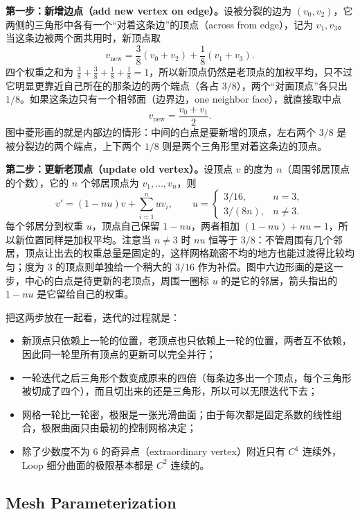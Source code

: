 \textbf{第一步：新增边点（add new vertex on edge）。}设被分裂的边为 $(v_0, v_2)$，它两侧的三角形中各有一个“对着这条边”的顶点（across from edge），记为 $v_1, v_3$。当这条边被两个面共用时，新顶点取
\[
v_{\text{new}} = \frac{3}{8}(v_0 + v_2) + \frac{1}{8}(v_1 + v_3).
\]
四个权重之和为 $\frac{3}{8} + \frac{3}{8} + \frac{1}{8} + \frac{1}{8} = 1$，所以新顶点仍然是老顶点的加权平均，只不过它明显更靠近自己所在的那条边的两个端点（各占 $3/8$），两个“对面顶点”各只出 $1/8$。如果这条边只有一个相邻面（边界边，one neighbor face），就直接取中点
\[
v_{\text{new}} = \frac{v_0 + v_1}{2}.
\]
图中菱形画的就是内部边的情形：中间的白点是要新增的顶点，左右两个 $3/8$ 是被分裂边的两个端点，上下两个 $1/8$ 则是两个三角形里对着这条边的顶点。

\textbf{第二步：更新老顶点（update old vertex）。}设顶点 $v$ 的度为 $n$（周围邻居顶点的个数），它的 $n$ 个邻居顶点为 $v_1, \ldots, v_n$，则
\[
v' = (1 - nu)v + \sum_{i=1}^{n} u v_i, \qquad
u = \begin{cases}
3/16, & n = 3, \\
3/(8n), & n \neq 3.
\end{cases}
\]
每个邻居分到权重 $u$，顶点自己保留 $1 - nu$，两者相加 $(1 - nu) + nu = 1$，所以新位置同样是加权平均。注意当 $n \neq 3$ 时 $nu$ 恒等于 $3/8$：不管周围有几个邻居，顶点让出去的权重总量是固定的，这样网格疏密不均的地方也能过渡得比较均匀；度为 3 的顶点则单独给一个稍大的 $3/16$ 作为补偿。图中六边形画的是这一步，中心的白点是待更新的老顶点，周围一圈标 $u$ 的是它的邻居，箭头指出的 $1 - nu$ 是它留给自己的权重。

把这两步放在一起看，迭代的过程就是：

\begin{itemize}[nosep]
    \item 新顶点只依赖上一轮的位置，老顶点也只依赖上一轮的位置，两者互不依赖，因此同一轮里所有顶点的更新可以完全并行；
    \item 一轮迭代之后三角形个数变成原来的四倍（每条边多出一个顶点，每个三角形被切成了四个），而且切出来的还是三角形，所以可以无限迭代下去；
    \item 网格一轮比一轮密，极限是一张光滑曲面；由于每次都是固定系数的线性组合，极限曲面只由最初的控制网格决定；
    \item 除了少数度不为 6 的奇异点（extraordinary vertex）附近只有 $C^1$ 连续外，Loop 细分曲面的极限基本都是 $C^2$ 连续的。
\end{itemize}

\subsection{Mesh Parameterization}

